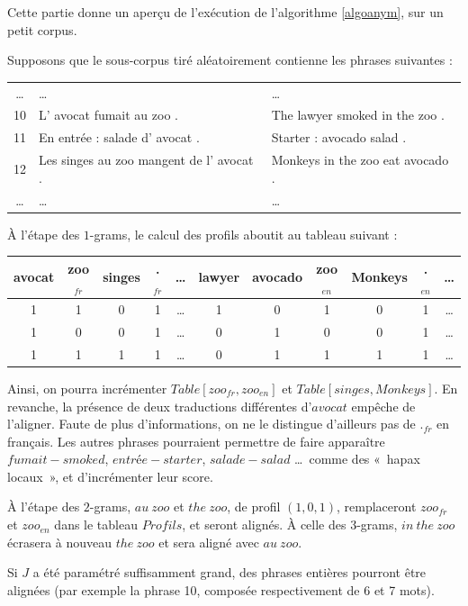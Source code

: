 \documentclass[a4paper,10pt]{article}
\newcommand{\guill}[1]{«~#1~»}
\begin{document}
\label{exempleanym}

Cette partie donne un aperçu de l'exécution de l'algorithme \ref{algoanym}, sur un petit corpus.

Supposons que le sous-corpus tiré aléatoirement contienne les phrases suivantes :

\begin{tabular}{|c|l|l|}
\hline
\dots & \dots & \dots \\
10 & L' avocat fumait au zoo . & The lawyer smoked in the zoo . \\
11 & En entrée : salade d' avocat . & Starter : avocado salad . \\
12 & Les singes au zoo mangent de l' avocat . & Monkeys in the zoo eat avocado . \\
\dots & \dots & \dots \\
\hline
\end{tabular}

\`A l'étape des $1$-grams, le calcul des profils aboutit au tableau suivant :

\begin{tabular}{|c|c|c|c|c|c|c|c|c|c|c|}
\hline
avocat & zoo$_{fr}$ & singes & .$_{fr}$ & \dots & lawyer & avocado & zoo$_{en}$ & Monkeys & .$_{en}$ & \dots \\
\hline
1 & 1 & 0 & 1 & \dots & 1 & 0 & 1 & 0 & 1 & \dots \\
1 & 0 & 0 & 1 & \dots & 0 & 1 & 0 & 0 & 1 & \dots \\
1 & 1 & 1 & 1 & \dots & 0 & 1 & 1 & 1 & 1 & \dots \\
\hline
\end{tabular}

Ainsi, on pourra incrémenter $Table[zoo_{fr},zoo_{en}]$ et $Table[singes,Monkeys]$. En revanche, la présence de deux traductions différentes d'$avocat$ empêche de l'aligner. Faute de plus d'informations, on ne le distingue d'ailleurs pas de $._{fr}$ en français. Les autres phrases pourraient permettre de faire apparaître $fumait-smoked$, $entrée-starter$, $salade-salad$ \dots~comme des \guill{hapax locaux}, et d'incrémenter leur score.

\`A l'étape des $2$-grams, $au~zoo$ et $the~zoo$, de profil $(1,0,1)$, remplaceront $zoo_{fr}$ et $zoo_{en}$ dans le tableau $Profils$, et seront alignés. \`A celle des $3$-grams, $in~the~zoo$ écrasera à nouveau $the~zoo$ et sera aligné avec $au~zoo$.

Si $J$ a été paramétré suffisamment grand, des phrases entières pourront être alignées (par exemple la phrase 10, composée respectivement de 6 et 7 mots).
\end{document}
